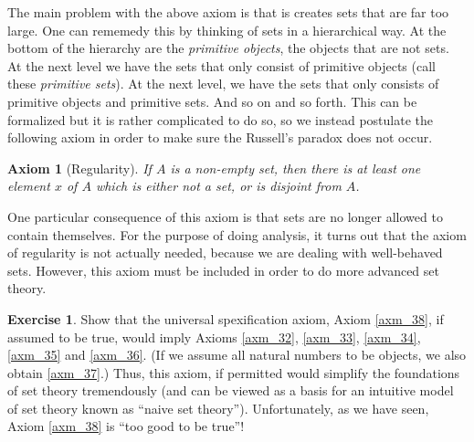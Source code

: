 \documentclass[a4paper, twocolumn]{report}
\newcounter{exercise} \numberwithin{exercise}{section}
\newcounter{axmcntr} \numberwithin{axmcntr}{chapter}
\newtheorem{axm}[axmcntr]{Axiom}
\theoremstyle{definition}
\newtheorem{exc}[exercise]{Exercise}
\theoremstyle{solution}
\begin{document}
The main problem with the above axiom is that is creates sets that are far too
large. One can rememedy this by thinking of sets in a hierarchical way. At the
bottom of the hierarchy are the \textit{primitive objects}, the objects that
are not sets. At the next level we have the sets that only consist of primitive
objects (call these \textit{primitive sets}). At the next level, we have the
sets that only consists of primitive objects and primitive sets. And so on and
so forth. This can be formalized but it is rather complicated to do so, so we
instead postulate the following axiom in order to make sure the Russell's
paradox does not occur.

\begin{axm}[Regularity]
  \label{axm_39}
  If $A$ is a non-empty set, then there is at least one element $x$ of $A$
  which is either not a set, or is disjoint from $A$. 
\end{axm}

One particular consequence of this axiom is that sets are no longer allowed to
contain themselves. For the purpose of doing analysis, it turns out that the
axiom of regularity is not actually needed, because we are dealing with
well-behaved sets. However, this axiom must be included in order to do more
advanced set theory.

\begin{exc}
  Show that the universal spexification axiom, Axiom \ref{axm_38}, if assumed
  to be true, would imply Axioms \ref{axm_32}, \ref{axm_33}, \ref{axm_34},
  \ref{axm_35} and \ref{axm_36}. (If we assume all natural numbers to be
  objects, we also obtain \ref{axm_37}.) Thus, this axiom, if permitted would
  simplify the foundations of set theory tremendously (and can be viewed as a
  basis for an intuitive model of set theory known as ``naive set theory'').
  Unfortunately, as we have seen, Axiom \ref{axm_38} is ``too good to be
  true''!
\end{exc}
\end{document}
